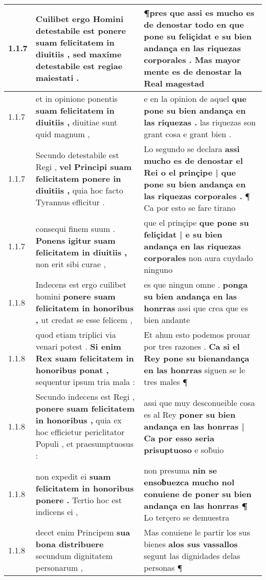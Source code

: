 \begin{tabular}{|p{1cm}|p{6.5cm}|p{6.5cm}|}
1.1.7 & Cuilibet ergo Homini detestabile est \textbf{ ponere suam felicitatem in diuitiis , } sed maxime detestabile est regiae maiestati . & ¶pres que assi es mucho es de denostar todo en que pone su feliçidat \textbf{ e su bien andança en las riquezas corporales . } Mas mayor mente es de denostar la Real magestad \\\hline
1.1.7 & et in opinione ponentis \textbf{ suam felicitatem in diuitiis , } diuitiae sunt quid magnum , & e en la opinion de aquel \textbf{ que pone su bien andança en las riquezas . } las riquezas son grant cosa e grant bien . \\\hline
1.1.7 & Secundo detestabile est Regi , \textbf{ vel Principi suam felicitatem ponere in diuitiis , } quia hoc facto Tyrannus efficitur . & Lo segundo se declara \textbf{ assi mucho es de denostar el Rei o el prinçipe | que pone su bien andança en las riquezas corporales . } ¶ Ca por esto se fare tirano \\\hline
1.1.7 & consequi finem suum . \textbf{ Ponens igitur suam felicitatem in diuitiis , } non erit sibi curae , & que el prinçipe \textbf{ que pone su feliçidat | e su bien andança en las riquezas corporales } non aura cuydado ninguno \\\hline
1.1.8 & Indecens est ergo cuilibet homini \textbf{ ponere suam felicitatem in honoribus , } ut credat se esse felicem , & es que ningun omne . \textbf{ ponga su bien andança en las honrras } assi que crea que es bien andante \\\hline
1.1.8 & quod etiam triplici via venari potest . \textbf{ Si enim Rex suam felicitatem in honoribus ponat , } sequentur ipsum tria mala : & Et ahun esto podemos prouar por tres razones . \textbf{ Ca si el Rey pone su bienandança en las honrras } siguen se le tres males ¶ \\\hline
1.1.8 & Secundo indecens est Regi , \textbf{ ponere suam felicitatem in honoribus , } quia ex hoc efficietur periclitator Populi , et praesumptuosus : & assi que muy desconueible cosa es al Rey \textbf{ poner su bien andança en las honrras | Ca por esso seria prisuptuoso } e sob̃uio \\\hline
1.1.8 & non expedit ei \textbf{ suam felicitatem in honoribus ponere . } Tertio hoc est indicens ei , & non presuma \textbf{ nin se ensoƀuezca mucho nol conuiene de poner su bien andança en las honrras ¶ } Lo terçero se demuestra \\\hline
1.1.8 & decet enim Principem \textbf{ sua bona distribuere } secundum dignitatem personarum , & Mas conuiene le partir los sus bienes \textbf{ alos sus vassallos } segunt las dignidades delas personas ¶ \\\hline

\end{tabular}
